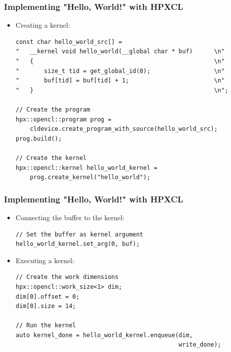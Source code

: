 \documentclass{beamer}
\begin{document}
\begin{frame}[fragile]
    \frametitle{Implementing "Hello, World!" with HPXCL}
    \begin{itemize}
        \item Creating a kernel:
        \begin{lstlisting}[firstnumber=53]
const char hello_world_src[] =                                            
"   __kernel void hello_world(__global char * buf)      \n"
"   {                                                   \n"
"       size_t tid = get_global_id(0);                  \n"
"       buf[tid] = buf[tid] + 1;                        \n"
"   }                                                   \n";

// Create the program
hpx::opencl::program prog =
    cldevice.create_program_with_source(hello_world_src);     
prog.build();                                                            
                                                                         
// Create the kernel                                             
hpx::opencl::kernel hello_world_kernel =
    prog.create_kernel("hello_world");           
        \end{lstlisting}
    \end{itemize}
\end{frame}

\begin{frame}[fragile]
    \frametitle{Implementing "Hello, World!" with HPXCL}
    \begin{itemize}
        \item Connecting the buffer to the kernel:
        \begin{lstlisting}[firstnumber=69]
// Set the buffer as kernel argument
hello_world_kernel.set_arg(0, buf);
        \end{lstlisting}
        \item Executing a kernel:
        \begin{lstlisting}[firstnumber=72]
// Create the work dimensions
hpx::opencl::work_size<1> dim;
dim[0].offset = 0;
dim[0].size = 14;

// Run the kernel
auto kernel_done = hello_world_kernel.enqueue(dim,
                                              write_done);
        \end{lstlisting}
    \end{itemize}
\end{frame}
\end{document}
